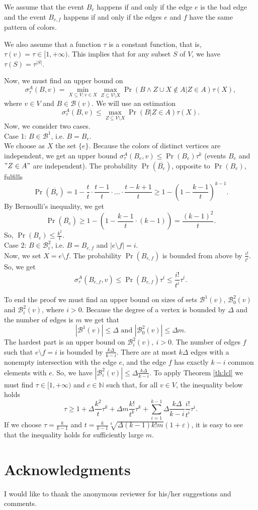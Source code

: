 \documentclass{article}
\begin{document}
	We assume that the event $B_e$ happens if and only if the edge $e$ is the bad edge and the event $B_{e,f}$ happens if and only if the edges $e$ and $f$ have the same pattern of colors.
	
	We also assume that a function $\tau$ is a constant function, that is, $\tau(v)=\tau\in[1,+\infty)$. This implies that for any subset $S$ of $V$, we have $\tau(S)=\tau^{|S|}$.
	
	Now, we must find an upper bound on 
	\[\sigma^A_{\tau}(B,v)=\min_{X\subseteq V:v\in X} \max_{Z\subseteq V\setminus X} \Pr(B \wedge Z \cup X \not\in A|Z\in A)\tau(X),\] 
	where $v\in V$ and $B\in\mathcal{B}(v)$. We will use an estimation 
    \[\sigma^A_{\tau}(B,v) \leq \max_{Z\subseteq V\setminus X} \Pr(B|Z\in A)\tau(X).\] Now, we consider two cases.\\
	
	\noindent Case 1: $B\in\mathcal{B}^1$, i.e. $B=B_e$.\\
	We choose as $X$ the set $\{e\}$. Because the colors of distinct vertices are independent, we get an upper bound $\sigma^A_{\tau}(B_e,v)\leq \Pr(B_e)\tau^k$ (events $B_e$ and $"Z\in A"$ are independent).
	The probability $\Pr(\overline{B_e})$, opposite to $\Pr(B_e)$, fulfills   \[\Pr(\overline{B_e})=1-\frac{t}{t}\cdot\frac{t-1}{t}\cdot\ldots\cdot\frac{t-k+1}{t}\geq 1-(1-\frac{k-1}{t})^{k-1}.\]
	By Bernoulli's inequality, we get 
	\[\Pr(\overline{B_e})\geq 1-(1-\frac{k-1}{t}\cdot (k-1))=\frac{(k-1)^2}{t}.\]
	So, $\Pr(B_e) \leq \frac{k^2}{t}$.\\
	
	\noindent Case 2: $B\in\mathcal{B}^2_i$, i.e. $B=B_{e,f}$ and $|e\setminus f|=i$.\\
	Now, we set $X=e \setminus f$. The probability $\Pr(B_{e,f})$ is bounded from above by $\frac{i!}{t^i}$. So, we get 
	\[\sigma^A_{\tau}(B_{e,f},v)\leq \Pr(B_{e,f})\tau^i \leq \frac{i!}{t^i}\tau^i.\]
	
	To end the proof we must find an upper bound on sizes of sets $\mathcal{B}^1(v)$, $\mathcal{B}^2_0(v)$ and $\mathcal{B}^2_i(v)$, where $ i>0$. Because the degree of a vertex is bounded by $\Delta$ and the number of edges is $m$ we get that 
	\[|\mathcal{B}^1(v)|\leq \Delta \text{ and } |\mathcal{B}^2_0(v)|\leq \Delta m.\]
	The hardest part is an upper bound on $\mathcal{B}^2_i(v),\ i>0$. 
	The number of edges $f$ such that $e\setminus f =i$ is bounded by $\frac{k\Delta}{k-i}$. There are at most $k\Delta$ edges with a nonempty intersection with the edge $e$, and the edge $f$ has exactly $k-i$ common elements with $e$. So, we have $|\mathcal{B}^2_i(v)|\leq \Delta \frac{k\Delta}{k-i}$.
	To apply Theorem \ref{th:lcl} we must find $\tau\in[1,+\infty)$ and $c\in\mathbb{N}$ such that, for all $v\in V$, the inequality below holds 
	\[\tau\geq 1+\Delta\frac{k^2}{t}\tau^k+\Delta m \frac{k!}{t^k}\tau^k+\sum_{i=1}^{k-1}\Delta\frac{k\Delta}{k-i}\frac{i!}{t^i}\tau^i.\]
	If we choose $\tau=\frac{k}{k-1}$ and $t=\frac{k}{k-1}\sqrt[k]{\Delta(k-1)k!m}(1+\varepsilon)$, it is easy to see that the inequality holds for sufficiently large $m$.
	
\section*{Acknowledgments}
I would like to thank the anonymous reviewer for his/her suggestions and comments.


\end{document}
